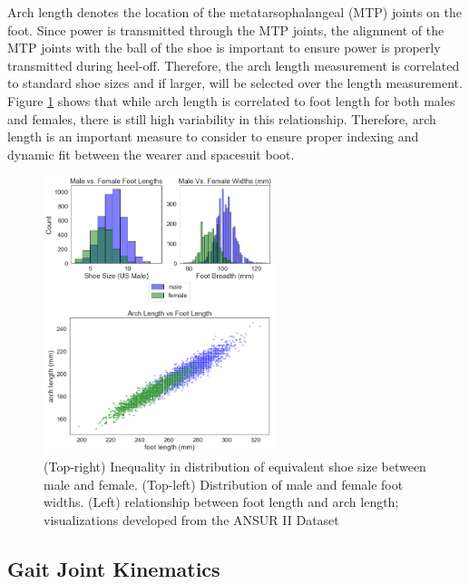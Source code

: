 \documentclass[defaultstyle,11pt]{thesis}
\begin{document}
Arch length denotes the location of the metatarsophalangeal (MTP) joints on the foot.
Since power is transmitted through the MTP joints, the alignment of the MTP joints with the ball of the shoe is important to ensure power is properly transmitted during heel-off.
Therefore, the arch length measurement is correlated to standard shoe sizes and if larger, will be selected over the length measurement.
Figure \ref{fig:SA3-ANSUR} shows that while arch length is correlated to foot length for both males and females, there is still high variability in this relationship.
Therefore, arch length is an important measure to consider to ensure proper indexing and dynamic fit between the wearer and spacesuit boot.

\begin{figure}
\hypertarget{fig:SA3-ANSUR}{%
\centering
\includegraphics[width=0.6\textwidth,height=\textheight]{../fig/SA3/ANSUR.png}
\caption{(Top-right) Inequality in distribution of equivalent shoe size between male and female. (Top-left) Distribution of male and female foot widths. (Left) relationship between foot length and arch length; visualizations developed from the ANSUR II Dataset}\label{fig:SA3-ANSUR}
}
\end{figure}

\hypertarget{gait-joint-kinematics}{%
\subsection{Gait Joint Kinematics}\label{gait-joint-kinematics}}
\end{document}
